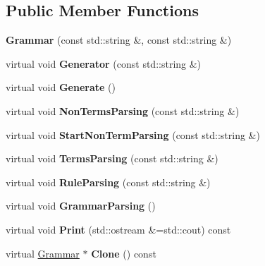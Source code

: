 \subsection*{Public Member Functions}
\begin{DoxyCompactItemize}
\item 
\mbox{\label{class_grammar_a5ae4e5db880c0167b6d70934308ecdf7}} 
{\bfseries Grammar} (const std\+::string \&, const std\+::string \&)
\item 
\mbox{\label{class_grammar_aa3769b85b2ca3eba1d0af9cd77aa9b9d}} 
virtual void {\bfseries Generator} (const std\+::string \&)
\item 
\mbox{\label{class_grammar_a186953ca011692489432971cec4965f7}} 
virtual void {\bfseries Generate} ()
\item 
\mbox{\label{class_grammar_a79f12115faf53b231e34b1e40e443664}} 
virtual void {\bfseries Non\+Terms\+Parsing} (const std\+::string \&)
\item 
\mbox{\label{class_grammar_a782f41eac47978d515b4ba5fa06c37dd}} 
virtual void {\bfseries Start\+Non\+Term\+Parsing} (const std\+::string \&)
\item 
\mbox{\label{class_grammar_a119ada593ad12ff9940a49eb1f71c9f4}} 
virtual void {\bfseries Terms\+Parsing} (const std\+::string \&)
\item 
\mbox{\label{class_grammar_a251593d0e88bd99a1c8f55b065f4d39b}} 
virtual void {\bfseries Rule\+Parsing} (const std\+::string \&)
\item 
\mbox{\label{class_grammar_aaf6ab2ee1f6988426f6796c12451e208}} 
virtual void {\bfseries Grammar\+Parsing} ()
\item 
\mbox{\label{class_grammar_a88135fd39f2bac99c761b1feef9d8c00}} 
virtual void {\bfseries Print} (std\+::ostream \&=std\+::cout) const
\item 
\mbox{\label{class_grammar_aecd99c02c9e13da44969cd9b07db7dcc}} 
virtual \hyperlink{class_grammar}{Grammar} $\ast$ {\bfseries Clone} () const
\end{DoxyCompactItemize}
